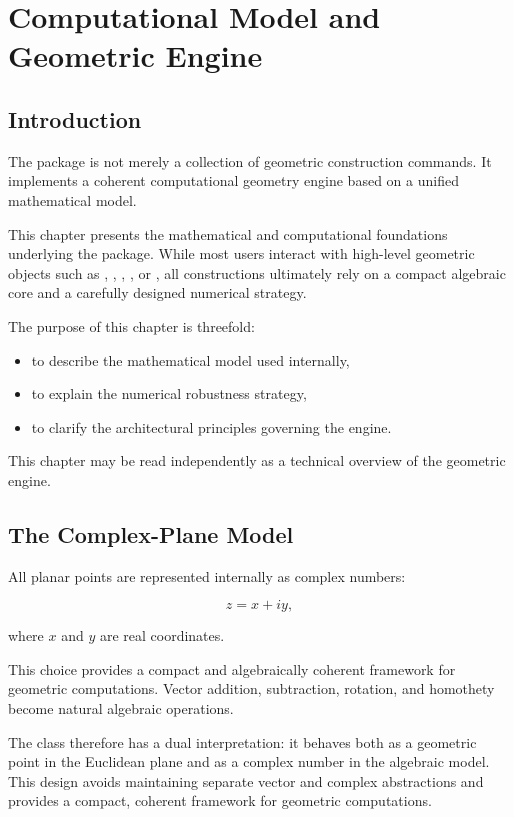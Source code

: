 \section{Computational Model and Geometric Engine}
\subsection{Introduction}

The package  is not merely a collection of geometric
construction commands. It implements a coherent computational geometry engine
based on a unified mathematical model.

This chapter presents the mathematical and computational foundations
underlying the package. While most users interact with high-level geometric
objects such as , , ,
, or , all constructions ultimately rely
on a compact algebraic core and a carefully designed numerical strategy.

The purpose of this chapter is threefold:

\begin{itemize}
\item to describe the mathematical model used internally,
\item to explain the numerical robustness strategy,
\item to clarify the architectural principles governing the engine.
\end{itemize}

This chapter may be read independently as a technical overview of the
geometric engine.

\subsection{The Complex-Plane Model}

All planar points are represented internally as complex numbers:

\[
z = x + iy,
\]

where \(x\) and \(y\) are real coordinates.

This choice provides a compact and algebraically coherent framework for
geometric computations. Vector addition, subtraction, rotation,
and homothety become natural algebraic operations.

The class  therefore has a dual interpretation:
it behaves both as a geometric point in the Euclidean plane and as a complex
number in the algebraic model. This design avoids maintaining separate
vector and complex abstractions and provides a compact, coherent framework
for geometric computations.

